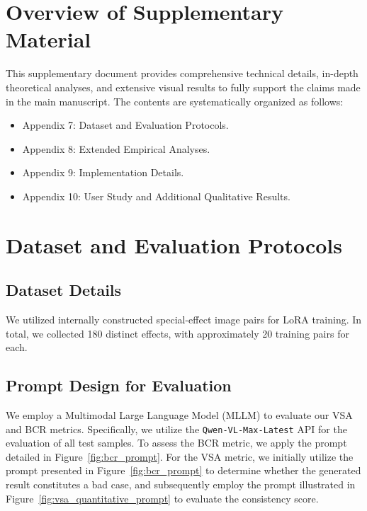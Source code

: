 \section*{Overview of Supplementary Material}

This supplementary document provides comprehensive technical details, in-depth theoretical analyses, and extensive visual results to fully support the claims made in the main manuscript. The contents are systematically organized as follows:

\begin{itemize}
    \item Appendix 7: Dataset and Evaluation Protocols.
    \item Appendix 8: Extended Empirical Analyses.
    \item Appendix 9: Implementation Details.
    \item Appendix 10: User Study and Additional Qualitative Results.
\end{itemize}

\section{Dataset and Evaluation Protocols}
\subsection{Dataset Details}
% 
We utilized internally constructed special-effect image pairs for LoRA training. In total, we collected 180 distinct effects, with approximately 20 training pairs for each. 
\subsection{Prompt Design for Evaluation}

We employ a Multimodal Large Language Model (MLLM) to evaluate our VSA and BCR metrics. Specifically, we utilize the \texttt{Qwen-VL-Max-Latest} API for the evaluation of all test samples. To assess the BCR metric, we apply the prompt detailed in Figure~\ref{fig:bcr_prompt}. For the VSA metric, we initially utilize the prompt presented in Figure~\ref{fig:bcr_prompt} to determine whether the generated result constitutes a bad case, and subsequently employ the prompt illustrated in Figure~\ref{fig:vsa_quantitative_prompt} to evaluate the consistency score.

